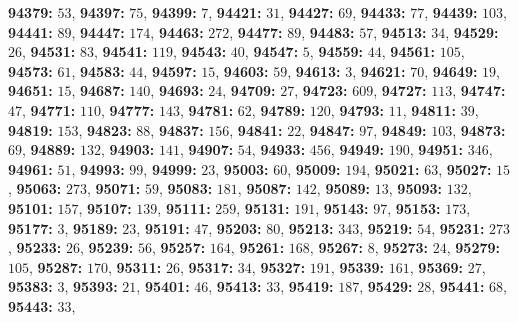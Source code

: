 \textsf{\bfseries 94379:} $53$, \textsf{\bfseries 94397:} $75$, \textsf{\bfseries 94399:} $7$, \textsf{\bfseries 94421:} $31$, \textsf{\bfseries 94427:} $69$, \textsf{\bfseries 94433:} $77$, \textsf{\bfseries 94439:} $103$, \textsf{\bfseries 94441:} $89$, \textsf{\bfseries 94447:} $174$, \textsf{\bfseries 94463:} $272$, \textsf{\bfseries 94477:} $89$, \textsf{\bfseries 94483:} $57$, \textsf{\bfseries 94513:} $34$, \textsf{\bfseries 94529:} $26$, \textsf{\bfseries 94531:} $83$, \textsf{\bfseries 94541:} $119$, \textsf{\bfseries 94543:} $40$, \textsf{\bfseries 94547:} $5$, \textsf{\bfseries 94559:} $44$, \textsf{\bfseries 94561:} $105$, \textsf{\bfseries 94573:} $61$, \textsf{\bfseries 94583:} $44$, \textsf{\bfseries 94597:} $15$, \textsf{\bfseries 94603:} $59$, \textsf{\bfseries 94613:} $3$, \textsf{\bfseries 94621:} $70$, \textsf{\bfseries 94649:} $19$, \textsf{\bfseries 94651:} $15$, \textsf{\bfseries 94687:} $140$, \textsf{\bfseries 94693:} $24$, \textsf{\bfseries 94709:} $27$, \textsf{\bfseries 94723:} $609$, \textsf{\bfseries 94727:} $113$, \textsf{\bfseries 94747:} $47$, \textsf{\bfseries 94771:} $110$, \textsf{\bfseries 94777:} $143$, \textsf{\bfseries 94781:} $62$, \textsf{\bfseries 94789:} $120$, \textsf{\bfseries 94793:} $11$, \textsf{\bfseries 94811:} $39$, \textsf{\bfseries 94819:} $153$, \textsf{\bfseries 94823:} $88$, \textsf{\bfseries 94837:} $156$, \textsf{\bfseries 94841:} $22$, \textsf{\bfseries 94847:} $97$, \textsf{\bfseries 94849:} $103$, \textsf{\bfseries 94873:} $69$, \textsf{\bfseries 94889:} $132$, \textsf{\bfseries 94903:} $141$, \textsf{\bfseries 94907:} $54$, \textsf{\bfseries 94933:} $456$, \textsf{\bfseries 94949:} $190$, \textsf{\bfseries 94951:} $346$, \textsf{\bfseries 94961:} $51$, \textsf{\bfseries 94993:} $99$, \textsf{\bfseries 94999:} $23$, \textsf{\bfseries 95003:} $60$, \textsf{\bfseries 95009:} $194$, \textsf{\bfseries 95021:} $63$, \textsf{\bfseries 95027:} $15$, \textsf{\bfseries 95063:} $273$, \textsf{\bfseries 95071:} $59$, \textsf{\bfseries 95083:} $181$, \textsf{\bfseries 95087:} $142$, \textsf{\bfseries 95089:} $13$, \textsf{\bfseries 95093:} $132$, \textsf{\bfseries 95101:} $157$, \textsf{\bfseries 95107:} $139$, \textsf{\bfseries 95111:} $259$, \textsf{\bfseries 95131:} $191$, \textsf{\bfseries 95143:} $97$, \textsf{\bfseries 95153:} $173$, \textsf{\bfseries 95177:} $3$, \textsf{\bfseries 95189:} $23$, \textsf{\bfseries 95191:} $47$, \textsf{\bfseries 95203:} $80$, \textsf{\bfseries 95213:} $343$, \textsf{\bfseries 95219:} $54$, \textsf{\bfseries 95231:} $273$, \textsf{\bfseries 95233:} $26$, \textsf{\bfseries 95239:} $56$, \textsf{\bfseries 95257:} $164$, \textsf{\bfseries 95261:} $168$, \textsf{\bfseries 95267:} $8$, \textsf{\bfseries 95273:} $24$, \textsf{\bfseries 95279:} $105$, \textsf{\bfseries 95287:} $170$, \textsf{\bfseries 95311:} $26$, \textsf{\bfseries 95317:} $34$, \textsf{\bfseries 95327:} $191$, \textsf{\bfseries 95339:} $161$, \textsf{\bfseries 95369:} $27$, \textsf{\bfseries 95383:} $3$, \textsf{\bfseries 95393:} $21$, \textsf{\bfseries 95401:} $46$, \textsf{\bfseries 95413:} $33$, \textsf{\bfseries 95419:} $187$, \textsf{\bfseries 95429:} $28$, \textsf{\bfseries 95441:} $68$, \textsf{\bfseries 95443:} $33$, 
